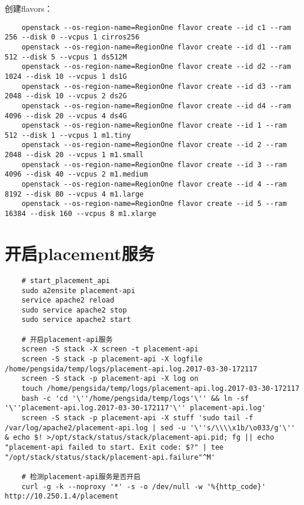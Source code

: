 \documentclass[a4paper,left=1.5cm,right=1.5cm,11pt]{article}
\begin{document}
	创建flavors：
	\begin{lstlisting}
	openstack --os-region-name=RegionOne flavor create --id c1 --ram 256 --disk 0 --vcpus 1 cirros256
	openstack --os-region-name=RegionOne flavor create --id d1 --ram 512 --disk 5 --vcpus 1 ds512M
	openstack --os-region-name=RegionOne flavor create --id d2 --ram 1024 --disk 10 --vcpus 1 ds1G
	openstack --os-region-name=RegionOne flavor create --id d3 --ram 2048 --disk 10 --vcpus 2 ds2G
	openstack --os-region-name=RegionOne flavor create --id d4 --ram 4096 --disk 20 --vcpus 4 ds4G
	openstack --os-region-name=RegionOne flavor create --id 1 --ram 512 --disk 1 --vcpus 1 m1.tiny
	openstack --os-region-name=RegionOne flavor create --id 2 --ram 2048 --disk 20 --vcpus 1 m1.small
	openstack --os-region-name=RegionOne flavor create --id 3 --ram 4096 --disk 40 --vcpus 2 m1.medium
	openstack --os-region-name=RegionOne flavor create --id 4 --ram 8192 --disk 80 --vcpus 4 m1.large
	openstack --os-region-name=RegionOne flavor create --id 5 --ram 16384 --disk 160 --vcpus 8 m1.xlarge
	\end{lstlisting}

\section{开启placement服务}
	\begin{lstlisting}
	# start_placement_api
	sudo a2ensite placement-api
	service apache2 reload
	sudo service apache2 stop
	sudo service apache2 start

	# 开启placement-api服务
	screen -S stack -X screen -t placement-api
	screen -S stack -p placement-api -X logfile /home/pengsida/temp/logs/placement-api.log.2017-03-30-172117
    screen -S stack -p placement-api -X log on
	touch /home/pengsida/temp/logs/placement-api.log.2017-03-30-172117
    bash -c 'cd '\''/home/pengsida/temp/logs'\'' && ln -sf '\''placement-api.log.2017-03-30-172117'\'' placement-api.log'
	screen -S stack -p placement-api -X stuff 'sudo tail -f /var/log/apache2/placement-api.log | sed -u '\''s/\\\\x1b/\o033/g'\'' & echo $! >/opt/stack/status/stack/placement-api.pid; fg || echo "placement-api failed to start. Exit code: $?" | tee "/opt/stack/status/stack/placement-api.failure"^M'

	# 检测placement-api服务是否开启
	curl -g -k --noproxy '*' -s -o /dev/null -w '%{http_code}' http://10.250.1.4/placement
	\end{lstlisting}
\end{document}

